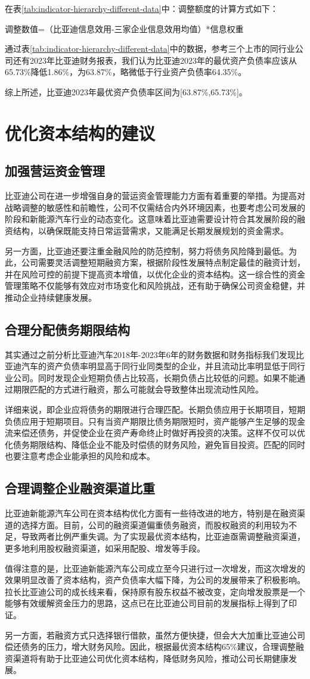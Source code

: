 在表\eqref{tab:indicator-hierarchy-different-data}中：调整额度的计算方式如下：

调整数值=（比亚迪信息效用-三家企业信息效用均值）*信息权重

通过表\eqref{tab:indicator-hierarchy-different-data}中的数据，参考三个上市的同行业公司还有2023年比亚迪财务报表，我们认为比亚迪2023年的最优资产负债率应该从65.73\%降低1.86\%，为63.87\%，略微低于行业资产负债率64.35\%。

综上所述，比亚迪2023年最优资产负债率区间为[63.87\%,65.73\%]。
\section{优化资本结构的建议}
\subsection{加强营运资金管理}
比亚迪公司在进一步增强自身的营运资金管理能力方面有着重要的举措。为提高对战略调整的敏感性和前瞻性，公司不仅需结合内外环境因素，也要考虑公司发展的阶段和新能源汽车行业的动态变化。这意味着比亚迪需要设计符合其发展阶段的融资结构，以确保既能支持日常运营需求，又能满足长期发展规划的资金需求。

另一方面，比亚迪还要注重金融风险的防范控制，努力将债务风险降到最低。为此，公司需要灵活调整短期融资方案，根据阶段性发展特点制定最佳的融资计划，并在风险可控的前提下提高资本增值，以优化企业的资本结构。这一综合性的资金管理策略不仅能够有效应对市场变化和风险挑战，还有助于确保公司资金稳健，并推动企业持续健康发展。
\subsection{合理分配债务期限结构}
其实通过之前分析比亚迪汽车2018年-2023年6年的财务数据和财务指标我们发现比亚迪汽车的资产负债率明显高于同行业同类型的企业，并且流动比率明显低于同行业公司。同时发现企业短期负债占比较高，长期负债占比较低的问题。如果不能通过期限匹配的方式进行融资，那么可能就会导致整体出现流动性风险。

详细来说，即企业应将债务的期限进行合理匹配。长期负债应用于长期项目，短期负债应用于短期项目。只有当资产期限比债务期限短时，资产能够产生足够的现金流来偿还债务，并促使企业在资产寿命终止时做好再投资的决策。这样不仅可以优化债务期限结构、降低企业不能及时偿债的财务风险，避免盲目投资。匹配的同时也要注意考虑企业能承担的风险和成本。
\subsection{合理调整企业融资渠道比重}
比亚迪新能源汽车公司在资本结构优化方面有一些待改进的地方，特别是在融资渠道的选择方面。目前，公司的融资渠道偏重债务融资，而股权融资的利用较为不足，导致两者比例严重失调。为了实现最优资本结构，比亚迪亟需调整融资渠道，更多地利用股权融资渠道，如采用配股、增发等手段。

值得注意的是，比亚迪新能源汽车公司成立至今只进行过一次增发，而这次增发的效果明显改善了资本结构，资产负债率大幅下降，为公司的发展带来了积极影响。拉长比亚迪公司的成长线来看，保持原有股东权益不被改变，定向增发股票是一个能够有效缓解资金压力的思路，这点已在比亚迪公司目前的发展指标上得到了印证。

另一方面，若融资方式只选择银行借款，虽然方便快捷，但会大大加重比亚迪公司偿还债务的压力，增大财务风险。因此，根据最优资本结构65\%建议，合理调整融资渠道将有助于比亚迪公司优化资本结构，降低财务风险，推动公司长期健康发展。